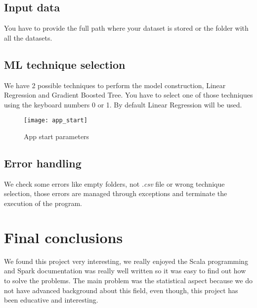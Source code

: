 \subsection{Input data}

You have to provide the full path where your dataset is stored or the folder with all the datasets.

\subsection{ML technique selection}

We have 2 possible techniques to perform the model construction, Linear Regression and Gradient Boosted Tree. You have to select one of those techniques using the keyboard numbers 0 or 1. By default Linear Regression will be used.

\begin{figure}[H]
	\centering
	\texttt{[image: app\_start]}
	\caption{App start parameters}
\end{figure}

\subsection{Error handling}

We check some errors like empty folders, not \textit{.csv} file or wrong technique selection, those errors are managed through exceptions and terminate the execution of the program.

\section{Final conclusions}

We found this project very interesting, we really enjoyed the Scala programming and Spark documentation was really well written so it was easy to find out how to solve the problems. The main problem was the statistical aspect because we do not have advanced background about this field, even though, this project has been educative and interesting.

